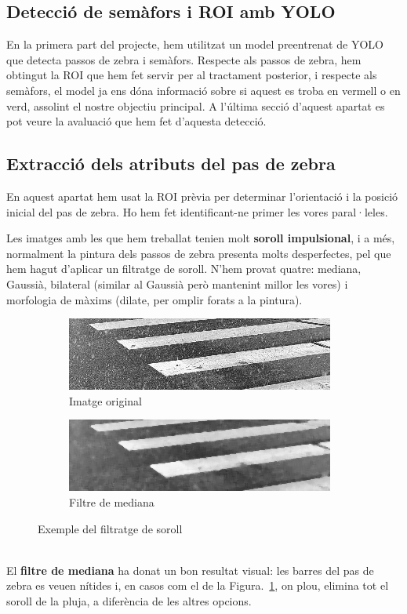 \documentclass[10pt,a4paper,twocolumn,twoside]{article}
\begin{document}
\subsection{Detecció de semàfors i ROI amb YOLO}
En la primera part del projecte, hem utilitzat un model preentrenat de YOLO que detecta passos de zebra i semàfors. Respecte als passos de zebra, hem obtingut la ROI que hem fet servir per al tractament posterior, i respecte als semàfors, el model ja ens dóna informació sobre si aquest es troba en vermell o en verd, assolint el nostre objectiu principal. A l'última secció d'aquest apartat es pot veure la avaluació que hem fet d'aquesta detecció.

\subsection{Extracció dels atributs del pas de zebra}

En aquest apartat hem usat la ROI prèvia per determinar l’orientació i la posició inicial del pas de zebra. Ho hem fet identificant-ne primer les vores paral·leles.

Les imatges amb les que hem treballat tenien molt \textbf{soroll impulsional}, i a més, normalment la pintura dels passos de zebra presenta molts desperfectes, pel que hem hagut d'aplicar un filtratge de soroll. N'hem provat quatre: mediana, Gaussià, bilateral (similar al Gaussià però mantenint millor les vores) i morfologia de màxims (dilate, per omplir forats a la pintura).
\vspace{5pt}
\begin{figure}[h]
	\centering
	\begin{subfigure}{0.46\columnwidth}
		\includegraphics[width=\linewidth]{figs/neu1}
		\caption{Imatge original}
	\end{subfigure}
	\quad
	\begin{subfigure}{0.46\columnwidth}
		\includegraphics[width=\linewidth]{figs/med_neu1}
		\caption{Filtre de mediana}
	\end{subfigure}
	\caption{Exemple del filtratge de soroll}
	\label{fig:soroll}
\end{figure}
\\
El \textbf{filtre de mediana} ha donat un bon resultat visual: les barres del pas de zebra es veuen nítides i, en casos com el de la Figura.~\ref{fig:soroll}, on plou, elimina tot el soroll de la pluja, a diferència de les altres opcions.
\end{document}
